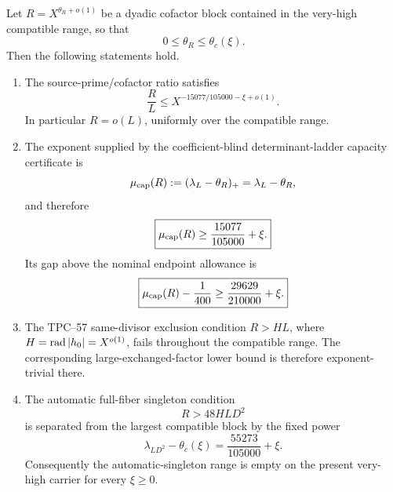\begin{theorem}
\label{thm:tpc59-compatible-endpoint-audit}
Let \(R=X^{\theta_R+o(1)}\) be a dyadic cofactor block contained in the
very-high compatible range, so that
\begin{equation}
 0\le\theta_R\le\theta_c(\xi).
 \label{eq:tpc59-compatible-theta-range}
\end{equation}
Then the following statements hold.
\begin{enumerate}[label=\textup{(\roman*)},leftmargin=3em]
 \item The source-prime/cofactor ratio satisfies
 \begin{equation}
  \frac RL
  \le X^{-15077/105000-\xi+o(1)}.
  \label{eq:tpc59-compatible-R-over-L}
 \end{equation}
 In particular \(R=o(L)\), uniformly over the compatible range.

 \item The exponent supplied by the coefficient-blind determinant-ladder
 capacity certificate is
 \begin{equation}
  \mu_{\rm cap}(R)
  :=(\lambda_L-\theta_R)_+
  =\lambda_L-\theta_R,
  \label{eq:tpc59-compatible-capacity-exponent}
 \end{equation}
 and therefore
 \begin{equation}
  \boxed{
  \mu_{\rm cap}(R)
  \ge\frac{15077}{105000}+\xi.}
  \label{eq:tpc59-compatible-capacity-floor}
 \end{equation}
 Its gap above the nominal endpoint allowance is
 \begin{equation}
  \boxed{
  \mu_{\rm cap}(R)-\frac1{400}
  \ge\frac{29629}{210000}+\xi.}
  \label{eq:tpc59-compatible-capacity-budget-gap}
 \end{equation}

 \item The TPC--57 same-divisor exclusion condition \(R>HL\), where
 \(H=\operatorname{rad}|h_0|=X^{o(1)}\), fails throughout the compatible range.  The
 corresponding large-exchanged-factor lower bound is therefore
 exponent-trivial there.

 \item The automatic full-fiber singleton condition
 \begin{equation}
  R>48HLD^2
  \label{eq:tpc59-automatic-singleton-condition}
 \end{equation}
 is separated from the largest compatible block by the fixed power
 \begin{equation}
  \boxed{
  \lambda_{LD^2}-\theta_c(\xi)
  =\frac{55273}{105000}+\xi.}
  \label{eq:tpc59-automatic-singleton-gap}
 \end{equation}
 Consequently the automatic-singleton range is empty on the present
 very-high carrier for every \(\xi\ge0\).
\end{enumerate}
\end{theorem}

